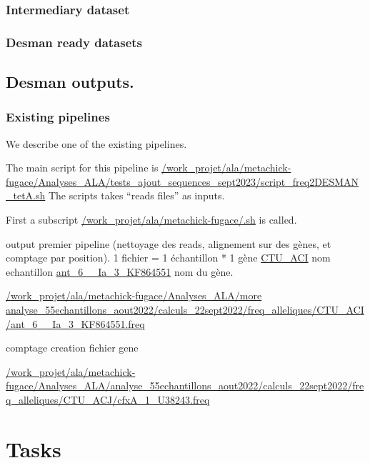 \documentclass{article}
\begin{document}
\subsubsection{Intermediary dataset}

\subsubsection{Desman ready datasets}

\subsection{Desman outputs.}



\subsubsection{Existing pipelines}
We describe one of the existing pipelines.

The main script for this pipeline is  \url{/work_projet/ala/metachick-fugace/Analyses_ALA/tests_ajout_sequences_sept2023/script_freq2DESMAN_tetA.sh}
The scripts takes ``reads files'' as inputs.

First a subscript \url{/work_projet/ala/metachick-fugace/.sh}
is called.

output premier pipeline (nettoyage des reads, alignement sur des gènes, et comptage par position).
1 fichier = 1 échantillon * 1 gène 
\url{CTU\_ACI} nom echantillon
\url{ant\_6\_\_Ia\_3\_KF864551} nom du gène.

\url{/work\_projet/ala/metachick-fugace/Analyses\_ALA/more analyse\_55echantillons\_aout2022/calculs\_22sept2022/freq\_alleliques/CTU\_ACI/ant\_6\_\_Ia\_3\_KF864551.freq}

comptage  creation fichier gene 


\url{/work_projet/ala/metachick-fugace/Analyses_ALA/analyse_55echantillons_aout2022/calculs_22sept2022/freq_alleliques/CTU_ACJ/cfxA_1_U38243.freq}



\subsection{}


\section{Tasks}
\end{document}
